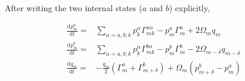 \documentclass[10pt,fleqn]{article}
\newcommand{\ud}{\mathrm{d}}
\newcommand{\eqar}[1]
{
  \begin{align*}
    #1
  \end{align*}
}
\newcommand{\paren}[1]{{\left({#1}\right)}}
\newcommand{\diff}[3][{}]{{\frac{\ud^{#1} {#2}}{\ud {#3}{}^{#1}}}}
\begin{document}
After writing the two internal states ($a$ and $b$) explicitly,
\eqar{
  \diff{p^a_{m}}{t}=&\sum_{\alpha=a,b;k}p^\alpha_{k}\Gamma^{a\alpha}_{mk}-p^a_{m}\Gamma^a_{m}+2\Omega_{m}q_m\\
  \diff{p^b_{m}}{t}=&\sum_{\alpha=a,b;k}p^\alpha_{k}\Gamma^{b\alpha}_{mk}-p^b_{m}\Gamma^b_{m}-2\Omega_{m-\delta}q_{m-\delta}\\
  \diff{q_m}{t}=&-\frac{q_{m}}{2}\paren{\Gamma^a_{m}+\Gamma^b_{m+\delta}}+\Omega_{m}\paren{p^b_{m+\delta}-p^a_{m}}
}
\end{document}
